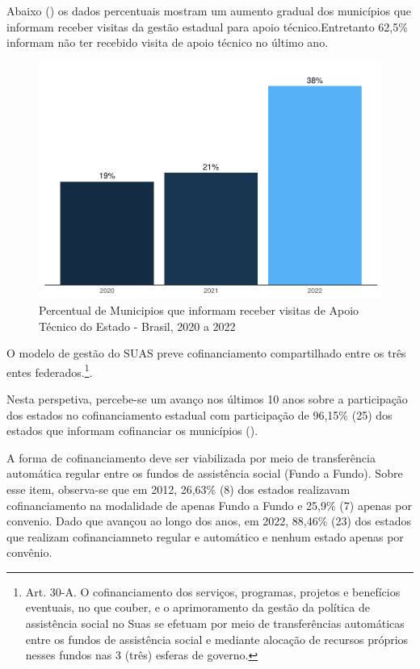 \documentclass[
  brazilian]{report}
\begin{document}
Abaixo () os dados percentuais mostram um
aumento gradual dos municípios que informam receber visitas da gestão
estadual para apoio técnico.Entretanto 62,5\% informam não ter recebido
visita de apoio técnico no último ano.

\begin{figure}
\includegraphics{Censo-SUAS-2022_files/figure-latex/munic_vit_estadual-1} \caption[Percentual de Municipios que informam receber visitas de Apoio Técnico do Estado - Brasil, 2020 a 2022]{Percentual de Municipios que informam receber visitas de Apoio Técnico do Estado - Brasil, 2020 a 2022}\label{fig:munic_vit_estadual}
\end{figure}

O modelo de gestão do SUAS preve cofinanciamento compartilhado entre os
três entes
federados.\footnote{Art. 30-A.  O cofinanciamento dos serviços, programas, projetos e benefícios eventuais, no que couber, e o aprimoramento da gestão da política de assistência social no Suas se efetuam por meio de transferências automáticas entre os fundos de assistência social e mediante alocação de recursos próprios nesses fundos nas 3 (três) esferas de governo.}.

Nesta perspetiva, percebe-se um avanço nos últimos 10 anos sobre a
participação dos estados no cofinanciamento estadual com participação de
96,15\% (25) dos estados que informam cofinanciar os municípios
().

A forma de cofinanciamento deve ser viabilizada por meio de
transferência automática regular entre os fundos de assistência social
(Fundo a Fundo). Sobre esse item, observa-se que em 2012, 26,63\% (8)
dos estados realizavam cofinanciamento na modalidade de apenas Fundo a
Fundo e 25,9\% (7) apenas por convenio. Dado que avançou ao longo dos
anos, em 2022, 88,46\% (23) dos estados que realizam cofinanciamneto
regular e automático e nenhum estado apenas por convênio.
\end{document}
